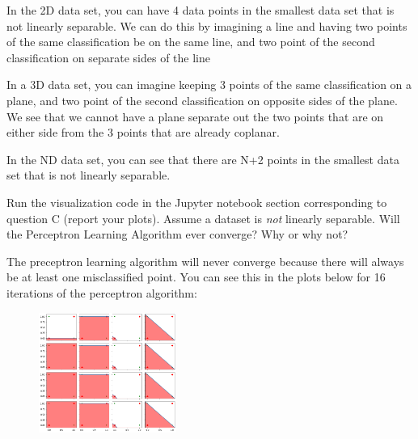 \begin{solution}
  In the 2D data set, you can have 4 data points in the smallest data set that is not linearly separable. We can do this by imagining a line and having two points of the same classification be on the same line, and two point of the second classification on separate sides of the line
  
  In a 3D data set, you can imagine keeping 3 points of the same classification on a plane, and two point of the second classification on opposite sides of the plane. We see that we cannot have a plane separate out the two points that are on either side from the 3 points that are already coplanar.
  
  In the ND data set, you can see that there are N+2 points in the smallest data set that is not linearly separable.
\end{solution}

\begin{problem}[2]
  Run the visualization code in the Jupyter notebook section corresponding to question C (report your plots). Assume a dataset is \emph{not} linearly separable. Will the Perceptron Learning Algorithm ever converge? Why or why not?
\end{problem}
\begin{solution}
  The preceptron learning algorithm will never converge because there will always be at least one misclassified point. You can see this in the plots below for 16 iterations of the perceptron algorithm:
  
  \begin{figure}[H]
    \centering
    \includegraphics[width=0.4\textwidth]{images/4_output_3.png}
  \end{figure}
\end{solution}

